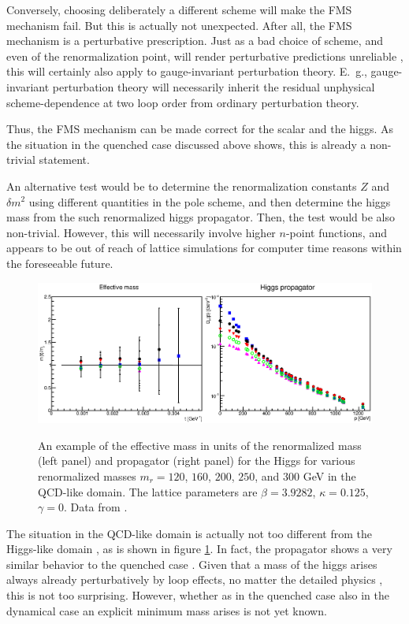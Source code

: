 \documentclass[final,twoside,12pt]{article}
\newcommand*{\1}{1\!\!\!\bot}
\begin{document}
Conversely, choosing deliberately a different scheme will make the FMS mechanism fail. But this is actually not unexpected. After all, the FMS mechanism is a perturbative prescription. Just as a bad choice of scheme, and even of the renormalization point, will render perturbative predictions unreliable \cite{BeiglboCk:2006lfa,Baglio:2011wn,Baglio:2011hc}, this will certainly also apply to gauge-invariant perturbation theory. E.\ g., gauge-invariant perturbation theory will necessarily inherit the residual unphysical scheme-dependence at two loop order from ordinary perturbation theory.

Thus, the FMS mechanism can be made correct for the scalar and the higgs. As the situation in the quenched case discussed above shows, this is already a non-trivial statement.

An alternative test would be to determine the renormalization constants $Z$ and $\delta m^2$ using different quantities in the pole scheme, and then determine the higgs mass from the such renormalized higgs propagator. Then, the test would be also non-trivial. However, this will necessarily involve higher $n$-point functions, and appears to be out of reach of lattice simulations for computer time reasons within the foreseeable future.

\begin{figure}
\includegraphics[width=\linewidth]{h-qcd}\\
\caption{\label{fig:h-qcd}An example of the effective mass in units of the renormalized mass (left panel) and propagator (right panel) for the Higgs for various renormalized masses $m_r=120$, $160$, $200$, $250$, and $300$ GeV in the QCD-like domain. The lattice parameters are $\beta=3.9282$, $\kappa=0.125$, $\gamma=0$. Data from \cite{Maas:2013aia,Maas:unpublished}.}
\end{figure}

The situation in the QCD-like domain is actually not too different from the Higgs-like domain \cite{Benes:2008ir,Fister:2010yw,Gies:2015lia,Maas:2013aia}, as is shown in figure \ref{fig:h-qcd}. In fact, the propagator shows a very similar behavior to the quenched case \cite{Maas:2016edk}. Given that a mass of the higgs arises always already perturbatively by loop effects, no matter the detailed physics \cite{Bohm:2001yx}, this is not too surprising. However, whether as in the quenched case also in the dynamical case an explicit minimum mass arises is not yet known.
\end{document}

